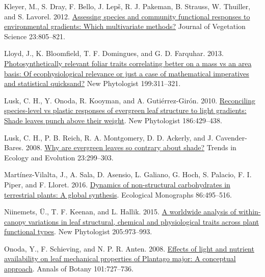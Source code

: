 \documentclass[
  12pt,
]{article}
\newlength{\cslhangindent}
\newlength{\cslentryspacingunit} %
\newenvironment{CSLReferences}[2] %
 {%
  \setlength{\parindent}{0pt}
  \ifodd #1
  \let\oldpar\par
  \def\par{\hangindent=\cslhangindent\oldpar}
  \fi
  \setlength{\parskip}{#2\cslentryspacingunit}
 }%
 {}
\begin{document}
\begin{CSLReferences}{1}{0}
\leavevmode{}%
Kleyer, M., S. Dray, F. Bello, J. Lepš, R. J. Pakeman, B. Strauss, W. Thuiller, and S. Lavorel. 2012. \href{https://doi.org/10.1111/j.1654-1103.2012.01402.x}{Assessing species and community functional responses to environmental gradients: Which multivariate methods?} Journal of Vegetation Science 23:805--821.

\leavevmode{}%
Lloyd, J., K. Bloomfield, T. F. Domingues, and G. D. Farquhar. 2013. \href{https://doi.org/10.1111/nph.12281}{Photosynthetically relevant foliar traits correlating better on a mass vs an area basis: Of ecophysiological relevance or just a case of mathematical imperatives and statistical quicksand?} New Phytologist 199:311--321.

\leavevmode{}%
Lusk, C. H., Y. Onoda, R. Kooyman, and A. Gutiérrez-Girón. 2010. \href{https://doi.org/10.1111/j.1469-8137.2010.03202.x}{Reconciling species-level vs plastic responses of evergreen leaf structure to light gradients: Shade leaves punch above their weight}. New Phytologist 186:429--438.

\leavevmode{}%
Lusk, C. H., P. B. Reich, R. A. Montgomery, D. D. Ackerly, and J. Cavender-Bares. 2008. \href{https://doi.org/10.1016/j.tree.2008.02.006}{Why are evergreen leaves so contrary about shade?} Trends in Ecology and Evolution 23:299--303.

\leavevmode{}%
Martínez-Vilalta, J., A. Sala, D. Asensio, L. Galiano, G. Hoch, S. Palacio, F. I. Piper, and F. Lloret. 2016. \href{https://doi.org/10.1002/ecm.1231}{Dynamics of non-structural carbohydrates in terrestrial plants: A global synthesis}. Ecological Monographs 86:495--516.

\leavevmode{}%
Niinemets, Ü., T. F. Keenan, and L. Hallik. 2015. \href{https://doi.org/10.1111/nph.13096}{A worldwide analysis of within-canopy variations in leaf structural, chemical and physiological traits across plant functional types}. New Phytologist 205:973--993.

\leavevmode{}%
Onoda, Y., F. Schieving, and N. P. R. Anten. 2008. \href{https://doi.org/10.1093/aob/mcn013}{Effects of light and nutrient availability on leaf mechanical properties of {Plantago} major: A conceptual approach}. Annals of Botany 101:727--736.


\end{CSLReferences}
\end{document}
